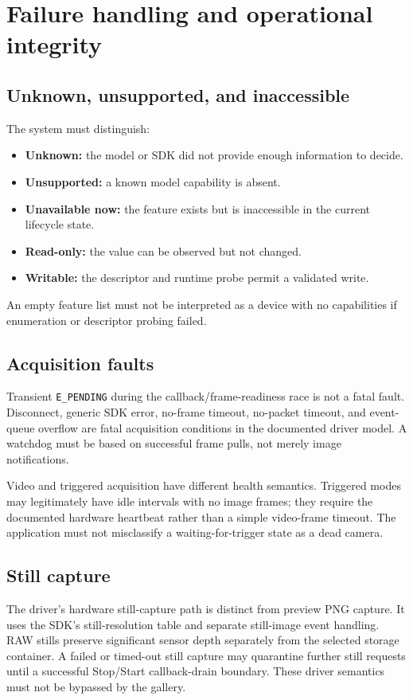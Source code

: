 \documentclass[11pt,a4paper,oneside]{article}
\newcommand{\code}[1]{\texttt{\small #1}}
\begin{document}
\section{Failure handling and operational integrity}

\subsection{Unknown, unsupported, and inaccessible}
The system must distinguish:
\begin{itemize}
  \item \textbf{Unknown:} the model or SDK did not provide enough information to decide.
  \item \textbf{Unsupported:} a known model capability is absent.
  \item \textbf{Unavailable now:} the feature exists but is inaccessible in the current lifecycle state.
  \item \textbf{Read-only:} the value can be observed but not changed.
  \item \textbf{Writable:} the descriptor and runtime probe permit a validated write.
\end{itemize}
An empty feature list must not be interpreted as a device with no capabilities if enumeration or descriptor probing failed.

\subsection{Acquisition faults}
Transient \code{E\_PENDING} during the callback/frame-readiness race is not a fatal fault. Disconnect, generic SDK error, no-frame timeout, no-packet timeout, and event-queue overflow are fatal acquisition conditions in the documented driver model. A watchdog must be based on successful frame pulls, not merely image notifications.

Video and triggered acquisition have different health semantics. Triggered modes may legitimately have idle intervals with no image frames; they require the documented hardware heartbeat rather than a simple video-frame timeout. The application must not misclassify a waiting-for-trigger state as a dead camera.

\subsection{Still capture}
The driver's hardware still-capture path is distinct from preview PNG capture. It uses the SDK's still-resolution table and separate still-image event handling. RAW stills preserve significant sensor depth separately from the selected storage container. A failed or timed-out still capture may quarantine further still requests until a successful Stop/Start callback-drain boundary. These driver semantics must not be bypassed by the gallery.
\end{document}
